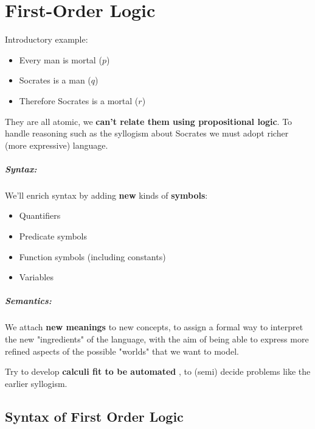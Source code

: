 
\chapter{First-Order Logic}

Introductory example:
\begin{itemize}
	\item Every man is mortal ($p$)
	\item Socrates is a man ($q$)
	\\ \bline
	\item Therefore Socrates is a mortal ($r$)
\end{itemize}
They are all atomic, we \textbf{can't relate them using propositional logic}.
To handle reasoning such as the syllogism about Socrates we must adopt richer (more expressive) language.

\paragraph{Syntax:} We'll enrich syntax by adding \textbf{new} kinds of \textbf{symbols}:
\begin{itemize}
	\item Quantifiers
	\item Predicate symbols
	\item Function symbols (including constants)
	\item Variables
\end{itemize}

\paragraph{Semantics:} We attach \textbf{new meanings} to new concepts, to assign a formal way to interpret the new "ingredients" of the language, with the aim of being able to express more refined aspects of the possible "worlds" that we want to model.

Try to develop \textbf{calculi fit to be automated} , to (semi) decide problems like the earlier syllogism.


\vspace{-0.3cm}

\section{Syntax of First Order Logic}

